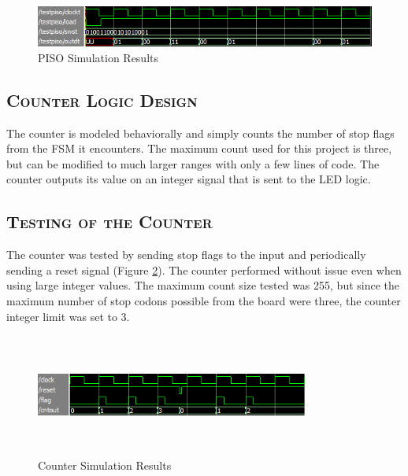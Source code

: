 \documentclass[11pt]{report}
\begin{document}
\begin{spacing}{1.5}
\vspace{15px}
\begin{figure}[H]
    \centering
    \includegraphics[width=1.0\textwidth,keepaspectratio]{piso.png}
    \caption{PISO Simulation Results}
    \label{fig:test_piso}
\end{figure}

\subsection{\scshape Counter Logic Design}
\label{sub:design_counter}

The counter is modeled behaviorally and simply counts the number of stop flags from the FSM it encounters.  The maximum count used for this project is three, but can be modified to much larger ranges with only a few lines of code.  The counter outputs its value on an integer signal that is sent to the LED logic.

\subsection{\scshape Testing of the Counter}
\label{sub:test_counter}

The counter was tested by sending stop flags to the input and periodically sending a reset signal (Figure \ref{fig:test_counter}).  The counter performed without issue even when using large integer values.  The maximum count size tested was 255, but since the maximum number of stop codons possible from the board were three, the counter integer limit was set to 3.

\vspace{15px}
\begin{figure}[H]
    \centering
    \includegraphics[width=0.8\textwidth,height=4cm,keepaspectratio]{counter.png}
    \caption{Counter Simulation Results\cite{Synth}}
    \label{fig:test_counter}
\end{figure}


\end{spacing}
\end{document}
